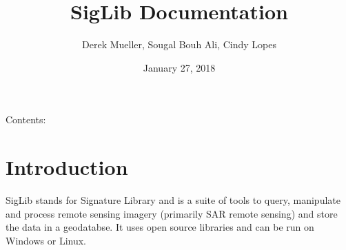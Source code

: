 \documentclass[letterpaper,10pt,english]{sphinxmanual}
\title{SigLib Documentation}
\date{January 27, 2018}
\author{Derek Mueller, Sougal Bouh Ali, Cindy Lopes}
\begin{document}
\maketitle
\tableofcontents
{}\label{index::doc}


Contents:


\chapter{Introduction}
\label{intro:introduction}\label{intro:welcome-to-siglib-s-documentation}\label{intro::doc}
SigLib stands for Signature Library and is a suite of tools to query,
manipulate and process remote sensing imagery (primarily SAR remote
sensing) and store the data in a geodatabse. It uses open source
libraries and can be run on Windows or Linux.
\end{document}
